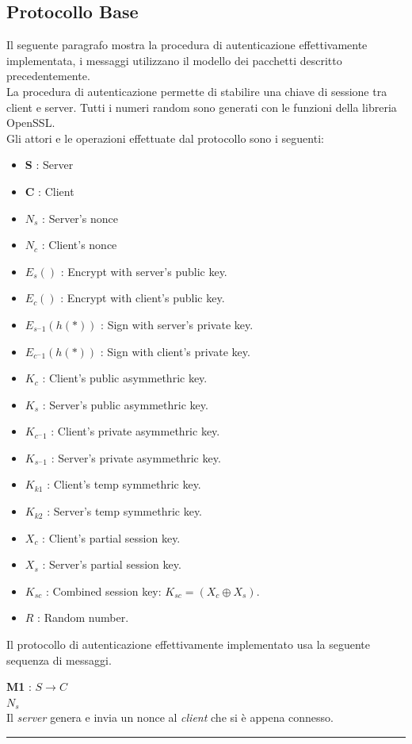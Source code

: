 \documentclass[a4paper,titlepage]{article}
\begin{document}
\subsection{Protocollo Base}
Il seguente paragrafo mostra la procedura di autenticazione effettivamente implementata, i messaggi utilizzano il modello dei pacchetti descritto precedentemente.\\
La procedura di autenticazione permette di stabilire una chiave di sessione tra client e server. Tutti i numeri random sono generati con le funzioni della libreria OpenSSL.\\
Gli attori e le operazioni effettuate dal protocollo sono i seguenti:
\begin{itemize}
\item \textbf{S} : Server
\item \textbf{C} : Client
\item $N_s$ : Server's nonce
\item $N_c$ : Client's nonce
\item $E_{s} ()$ : Encrypt with server's public key. 
\item $E_{c} ()$ : Encrypt with client's public key.
\item $E_{s^-1} (h(*))$ : Sign with server's private key. 
\item $E_{c^-1} (h(*))$ : Sign with client's private key.
\item $K_c$ : Client's public asymmethric key.
\item $K_s$ : Server's public asymmethric key.
\item $K_{c^-1}$ : Client's private asymmethric key.
\item $K_{s^-1}$ : Server's private asymmethric key.
\item $K_{k1}$ : Client's temp symmethric key.
\item $K_{k2}$ : Server's temp symmethric key.
\item $X_c$ : Client's partial session key.
\item $X_s$ : Server's partial session key.
\item $K_{sc}$ : Combined session key: $ K_{sc} = (X_c \oplus X_s) $.
\item $R$ : Random number.
\end{itemize}
Il protocollo di autenticazione effettivamente implementato usa la seguente sequenza di messaggi.
\begin{center}
\textbf{M1} : $S \rightarrow C$ \\ $N_s$ \\[0.3cm]
Il \textit{server} genera e invia un nonce al \textit{client} che si è appena connesso.\\[0.3cm]
\rule{6cm}{0.4pt}
\end{center}
\end{document}
